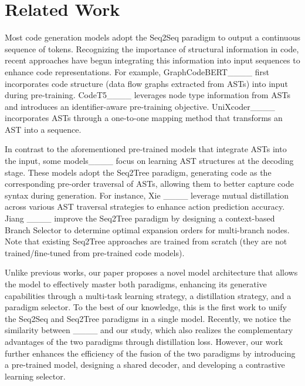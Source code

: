 \section{Related Work}
Most code generation models adopt the Seq2Seq paradigm to output a continuous sequence of tokens. Recognizing the importance of structural information in code, recent approaches have begun integrating this information into input sequences to enhance code representations. For example, GraphCodeBERT____ first incorporates code structure (\ie data flow graphs extracted from ASTs) into input during pre-training. %
CodeT5____ leverages node type information from ASTs and introduces an identifier-aware pre-training objective. UniXcoder____ incorporates ASTs through a one-to-one mapping method that transforms an AST into a sequence.

In contrast to the aforementioned pre-trained models that integrate ASTs into the input, some models____ focus on learning AST structures at the decoding stage. These models adopt the Seq2Tree paradigm, generating code as the corresponding pre-order traversal of ASTs, allowing them to better capture code syntax during generation. For instance, Xie \etal ____ leverage mutual distillation across various AST traversal strategies to enhance action prediction accuracy. Jiang \etal____ improve the Seq2Tree paradigm by designing a context-based Branch Selector to determine optimal expansion orders for multi-branch nodes. Note that existing Seq2Tree approaches are trained from scratch (\ie they are not trained/fine-tuned from pre-trained code models).



Unlike previous works, our paper proposes a novel model architecture that allows the model to effectively master both paradigms, enhancing its generative capabilities through a multi-task learning strategy, a distillation strategy, and a paradigm selector. To the best of our knowledge, this is the first work to unify the Seq2Seq and Seq2Tree paradigms in a single model.
Recently, we notice the similarity between ____ and our study, which also realizes the complementary advantages of the two paradigms through distillation loss. However, our work further enhances the efficiency of the fusion of the two paradigms by introducing a pre-trained model, designing a shared decoder, and developing a contrastive learning selector.




